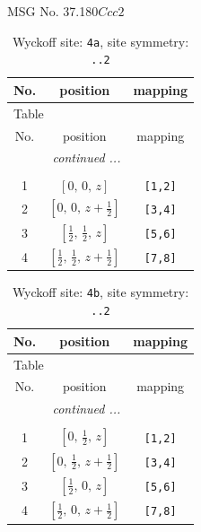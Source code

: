 \documentclass[fleqn,8pt]{jsarticle}
\begin{document}
\setcounter{MaxMatrixCols}{32}

\renewcommand{\tablename}{Table~}
\renewcommand{\figurename}{Figure~}
\begin{center}
\LARGE
MSG No. 37.180\quad$Ccc2$
\end{center}
\renewcommand{\arraystretch}{1.2}
\begin{longtable}{ccc}
\caption{Wyckoff site: {\tt 4a}, site symmetry: {\tt ..2}}
 \\
 \hline \hline
No. & position & mapping \\ \hline \endfirsthead

\multicolumn{2}{l}{\tablename\ \thetable{}} \\
 \hline \hline
No. & position & mapping \\ \hline \endhead

 \hline \hline
\multicolumn{2}{r}{\footnotesize\it continued ...} \\ \endfoot

 \hline \hline
\multicolumn{2}{r}{} \\ \endlastfoot

1 & $\left[ 0,\, 0,\, z \right]$ & {\tt [1,2]} \\ \hline
2 & $\left[ 0,\, 0,\, z + \frac{1}{2} \right]$ & {\tt [3,4]} \\ \hline
3 & $\left[ \frac{1}{2},\, \frac{1}{2},\, z \right]$ & {\tt [5,6]} \\ \hline
4 & $\left[ \frac{1}{2},\, \frac{1}{2},\, z + \frac{1}{2} \right]$ & {\tt [7,8]} \\
\end{longtable}
\renewcommand{\arraystretch}{1.2}
\begin{longtable}{ccc}
\caption{Wyckoff site: {\tt 4b}, site symmetry: {\tt ..2}}
 \\
 \hline \hline
No. & position & mapping \\ \hline \endfirsthead

\multicolumn{2}{l}{\tablename\ \thetable{}} \\
 \hline \hline
No. & position & mapping \\ \hline \endhead

 \hline \hline
\multicolumn{2}{r}{\footnotesize\it continued ...} \\ \endfoot

 \hline \hline
\multicolumn{2}{r}{} \\ \endlastfoot

1 & $\left[ 0,\, \frac{1}{2},\, z \right]$ & {\tt [1,2]} \\ \hline
2 & $\left[ 0,\, \frac{1}{2},\, z + \frac{1}{2} \right]$ & {\tt [3,4]} \\ \hline
3 & $\left[ \frac{1}{2},\, 0,\, z \right]$ & {\tt [5,6]} \\ \hline
4 & $\left[ \frac{1}{2},\, 0,\, z + \frac{1}{2} \right]$ & {\tt [7,8]} \\
\end{longtable}
\end{document}

